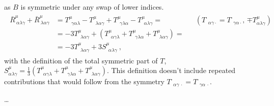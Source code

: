 \documentclass[letterpaper,10pt,english]{jupyterBook}
\begin{document}
\sphinxAtStartPar
as \(B\) is symmetric under any swap of lower indices.
\begin{equation*}
\begin{split}\begin{aligned}
  \bar{R}^{\mu}_{\ \alpha \lambda \gamma} + \bar{R}^{\mu}_{\ \lambda \alpha \gamma}
  & = T^{\mu}_{\ \ \gamma \alpha \lambda} - T^{\mu}_{\ \ \lambda \alpha \gamma} + T^{\mu}_{\ \ \gamma \lambda \alpha} - T^{\mu}_{\ \ \alpha \lambda \gamma} = && \left(\text{$T^{\cdot}_{\ \ \alpha \gamma \cdot} = T^{\cdot}_{\ \ \gamma \alpha \cdot}$, $\mp T^{\mu}_{\alpha \lambda \gamma}$}\right) \\
  & = - 3 T^{\mu}_{\ \ \lambda \alpha \gamma} + \left( T^{\mu}_{\ \ \alpha \gamma \lambda} + T^{\mu}_{\ \ \gamma \lambda \alpha} + T^{\mu}_{\ \ \lambda \alpha \gamma} \right) = \\
  & = - 3 T^{\mu}_{\ \ \lambda \alpha \gamma} + 3 S^{\mu}_{\ \ \alpha \lambda \gamma} \ , 
\end{aligned}\end{split}
\end{equation*}
\sphinxAtStartPar
with the definition of the total symmetric part of \(T\), \(S^{\mu}_{\alpha \lambda \gamma} = \frac{1}{3} \left( T^{\mu}_{\ \ \alpha \gamma \lambda} + T^{\mu}_{\ \ \gamma \lambda \alpha} + T^{\mu}_{\ \ \lambda \alpha \gamma}  \right)\). This definition doesn’t include repeated contributions that would follow from the symmetry \(T^{\cdot}_{\ \ \alpha \gamma \ \cdot} = T^{\cdot}_{\ \ \gamma \alpha \ \cdot}\).

\sphinxAtStartPar
…
\end{document}

